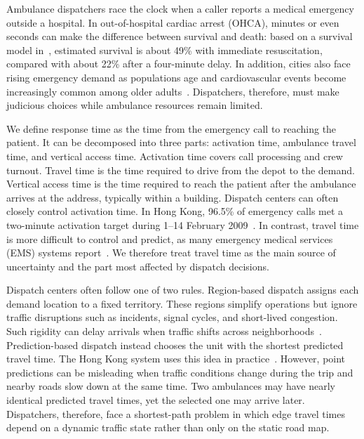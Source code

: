 \documentclass[11pt, letterpaper, oneside, reqno]{amsart}
\begin{document}
Ambulance dispatchers race the clock when a caller reports a medical emergency outside a hospital. In out-of-hospital cardiac arrest (OHCA), minutes or even seconds can make the difference between survival and death: based on a survival model in~\cite{ref:waalewijn2001survival}, estimated survival is about 49\% with immediate resuscitation, compared with about 22\% after a four-minute delay. In addition, cities also face rising emergency demand as populations age and cardiovascular events become increasingly common among older adults~\cite{ref:north2012intersection}. Dispatchers, therefore, must make judicious choices while ambulance resources remain limited.

We define response time as the time from the emergency call to reaching the patient. It can be decomposed into three parts: activation time, ambulance travel time, and vertical access time. Activation time covers call processing and crew turnout. Travel time is the time required to drive from the depot to the demand. Vertical access time is the time required to reach the patient after the ambulance arrives at the address, typically within a building. Dispatch centers can often closely control activation time. In Hong Kong, 96.5\% of emergency calls met a two-minute activation target during 1--14 February 2009~\cite{ref:pac2009fsd}. In contrast, travel time is more difficult to control and predict, as many emergency medical services (EMS) systems report~\cite{ref:ufa2020soc, ref:indiantown2019ems}. We therefore treat travel time as the main source of uncertainty and the part most affected by dispatch decisions.

Dispatch centers often follow one of two rules. Region-based dispatch assigns each demand location to a fixed territory. These regions simplify operations but ignore traffic disruptions such as incidents, signal cycles, and short-lived congestion. Such rigidity can delay arrivals when traffic shifts across neighborhoods~\cite{ref:jagtenberg2017optimal}. Prediction-based dispatch instead chooses the unit with the shortest predicted travel time. The Hong Kong system uses this idea in practice~\cite{ref:audit2008fsd}. However, point predictions can be misleading when traffic conditions change during the trip and nearby roads slow down at the same time. Two ambulances may have nearly identical predicted travel times, yet the selected one may arrive later. Dispatchers, therefore, face a shortest-path problem in which edge travel times depend on a dynamic traffic state rather than only on the static road map.
\end{document}
